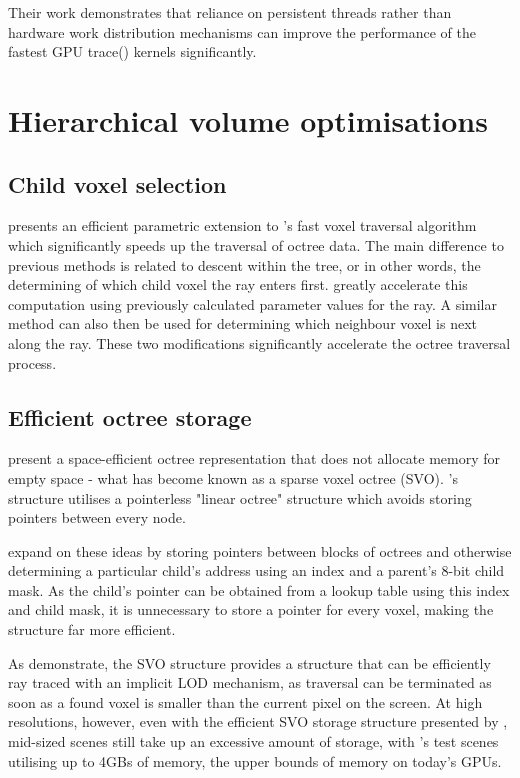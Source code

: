 Their work demonstrates that reliance on persistent threads rather than hardware work distribution mechanisms can improve the performance of the fastest GPU trace() kernels significantly.

\section{Hierarchical volume optimisations}

\subsection{Child voxel selection}
\cite{revelles00anefficient} presents an efficient parametric extension to \citeauthor{amanatides87afast}'s fast voxel traversal algorithm which significantly speeds up the traversal of octree data. The main difference to previous methods is related to descent within the tree, or in other words, the determining of which child voxel the ray enters first. \citeauthor{revelles00anefficient} greatly accelerate this computation using previously calculated parameter values for the ray. A similar method can also then be used for determining which neighbour voxel is next along the ray. These two modifications significantly accelerate the octree traversal process.

\subsection{Efficient octree storage}
\cite{wilhelms00octreesfor} present a space-efficient octree representation that does not allocate memory for empty space - what has become known as a sparse voxel octree (SVO). \citeauthor{wilhelms00octreesfor}'s structure utilises a pointerless "linear octree" structure which avoids storing pointers between every node.

\cite{laine10efficientsvos} expand on these ideas by storing pointers between blocks of octrees and otherwise determining a particular child's address using an index and a parent's 8-bit child mask. As the child's pointer can be obtained from a lookup table using this index and child mask, it is unnecessary to store a pointer for every voxel, making the structure far more efficient.

As \citeauthor{laine10efficientsvos} demonstrate, the SVO structure provides a structure that can be efficiently ray traced with an implicit LOD mechanism, as traversal can be terminated as soon as a found voxel is smaller than the current pixel on the screen. At high resolutions, however, even with the efficient SVO storage structure presented by \citeauthor{laine10efficientsvos}, mid-sized scenes still take up an excessive amount of storage, with \citeauthor{laine10efficientsvos}'s test scenes utilising up to 4GBs of memory, the upper bounds of memory on today's GPUs.

